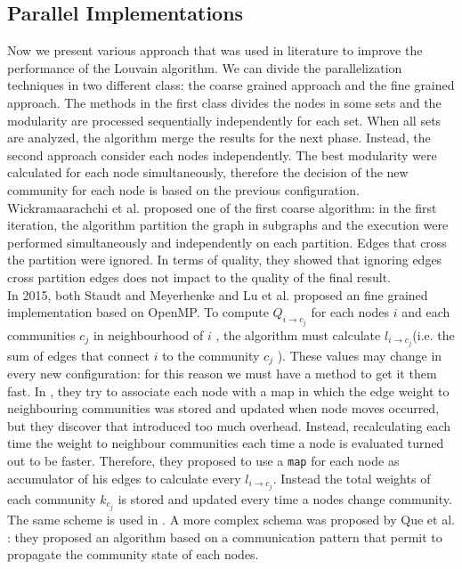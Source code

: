 \subsection{Parallel Implementations}
Now we present various approach that was used in literature to improve the performance of the Louvain algorithm. We can divide the parallelization techniques in two different class: the coarse grained approach and the fine grained approach. The methods in the first class divides the nodes in some sets and the modularity are processed sequentially independently for each set. When all sets are analyzed, the algorithm merge the results for the next phase. Instead, the second approach consider each nodes independently. The best modularity were calculated for each node simultaneously, therefore the decision of the new community for each node is based on the previous configuration. Wickramaarachchi et al. \cite{wickramaarachchi2014fast} proposed one of the first coarse algorithm: in the first iteration, the algorithm partition the graph in subgraphs and the execution were performed simultaneously and independently on each partition. Edges that cross the partition were ignored. In terms of quality, they showed that ignoring edges cross partition edges does not impact to the quality
of the final result. \\
In 2015, both Staudt and Meyerhenke \cite{staudt2015engineering} and Lu et al. \cite{lu2015parallel} proposed an fine grained implementation based on OpenMP. To compute $Q_{i \rightarrow c_j}$ for each nodes $i$ and each communities $c_j$ in neighbourhood of $i$ , the algorithm  must calculate $l_{i\rightarrow c_j}$(i.e. the sum of edges that connect $i$ to the community $c_j$ ). These values may change in every new configuration: for this reason we must have a method to get it them fast. In \cite{staudt2015engineering}, they try to associate each node with a map in which the edge weight to neighbouring communities was stored and updated when node moves occurred, but they discover that introduced too much overhead.
Instead, recalculating each time the weight to neighbour communities each time a node is evaluated turned out to be faster. Therefore, they proposed to use a \verb|map| for each node as accumulator of his edges to calculate every $l_{i\rightarrow c_j}$. Instead the total weights of each community $k_{c_j}$ is stored and updated every time a nodes change community. The same scheme is used in \cite{lu2015parallel}. A more complex schema was proposed by Que et al. \cite{que2015scalable}: they proposed an algorithm based on a communication pattern that permit to propagate the community state of each nodes. 
